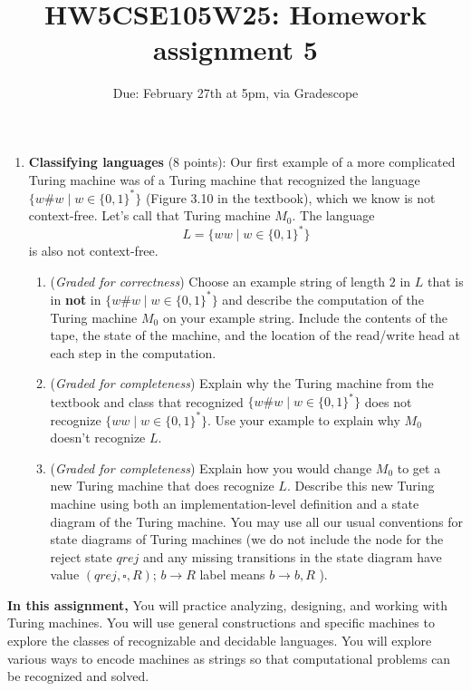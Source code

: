 \documentclass[12pt, oneside]{article}
\newcommand{\gradeCorrect}{({\it Graded for correctness}) }
\newcommand{\gradeComplete}{({\it Graded for completeness}) }
\begin{document}
\begin{enumerate}[wide, labelwidth=!, labelindent=0pt]
\item\textbf{Classifying languages} (8 points):
Our first example of a more complicated Turing machine was of a Turing machine 
that recognized the language $\{w \# w \mid w \in\{0,1\}^*\}$ 
(Figure 3.10 in the textbook), which we 
know is not context-free. Let's call that Turing machine $M_0$. The language
\[
    L = \{ww \mid w \in \{0,1\}^*\}
\]
is also not context-free. 

\begin{enumerate}
    \item\gradeCorrect Choose an example string of length $2$ in $L$ that is in {\bf not} in $\{w \# w \mid w \in\{0,1\}^*\}$ and describe the computation of the Turing machine $M_0$ on your example string. 
    Include the contents of the  tape, the state of the machine, and the location of the read/write head at each step in the computation.
    \item\gradeComplete Explain why the Turing machine from the textbook 
    and class that recognized $\{w \# w \mid w \in\{0,1\}^*\}$ does 
    not recognize $\{ww \mid w \in \{0,1\}^*\}$. Use your example to explain why $M_0$ doesn't recognize $L$.
    \item\gradeComplete Explain how you would change $M_0$ to get a 
    new Turing machine that does recognize $L$. Describe this new Turing machine using both an implementation-level definition and a state diagram of the Turing machine. You may use all 
    our usual conventions for state diagrams of Turing machines 
    (we do not include the node for the reject state $qrej$ and any missing transitions 
    in the state diagram have value $(qrej,\square,R)$; 
    $b \to R$ label means $b \to b, R$ ).
\end{enumerate}
\end{enumerate}
\newpage

\title{HW5CSE105W25: Homework assignment 5}
\date{Due: February 27th at 5pm, via Gradescope}


\maketitle
\thispagestyle{fancy}

{\bf In this assignment,}
You will practice analyzing, designing, and working with Turing machines.
You will use general constructions and specific machines to explore the classes 
of recognizable and decidable languages. 
You will explore various ways to encode machines as strings so that 
computational problems can be recognized and solved.
\end{document}
